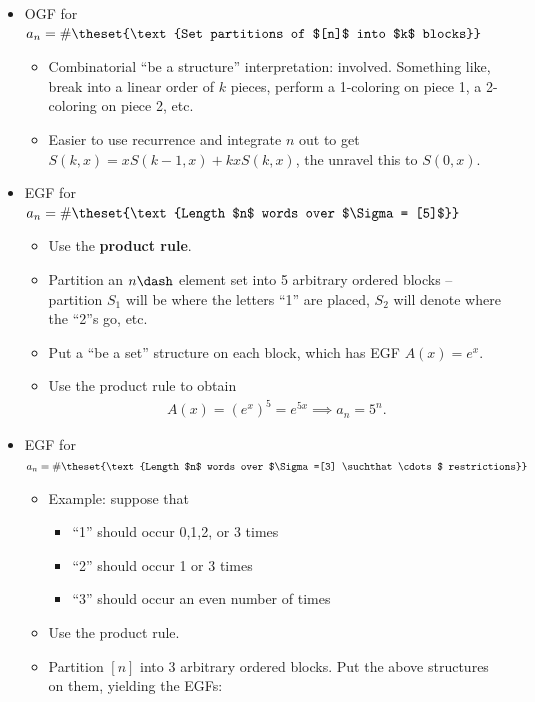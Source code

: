 \begin{itemize}
\tightlist
\item
  OGF for
  \(a_n = \#\theset{\text{Set partitions of $[n]$ into $k$ blocks}}\)

  \begin{itemize}
  \tightlist
  \item
    Combinatorial ``be a structure'' interpretation: involved. Something
    like, break into a linear order of \(k\) pieces, perform a
    1-coloring on piece 1, a 2-coloring on piece 2, etc.
  \item
    Easier to use recurrence and integrate \(n\) out to get
    \(S(k, x) = xS(k-1, x) + kxS(k, x)\), the unravel this to
    \(S(0, x)\).
  \end{itemize}
\item
  EGF for
  \(a_n = \#\theset{\text{Length $n$ words over $\Sigma = [5]$}}\)

  \begin{itemize}
  \tightlist
  \item
    Use the \textbf{product rule}.
  \item
    Partition an \(n\dash\) element set into 5 arbitrary ordered blocks
    -- partition \(S_1\) will be where the letters ``1'' are placed,
    \(S_2\) will denote where the ``2''s go, etc.
  \item
    Put a ``be a set'' structure on each block, which has EGF
    \(A(x) = e^x\).
  \item
    Use the product rule to obtain
    \begin{align*}
    A(x) = (e^x)^5 = e^{5x} \implies a_n = 5^n.
    \end{align*}
  \end{itemize}
\item
  EGF for
  \(a_n = \#\theset{\text{Length $n$ words over $\Sigma =[3] \suchthat \cdots$ restrictions}}\)

  \begin{itemize}
  \tightlist
  \item
    Example: suppose that

    \begin{itemize}
    \tightlist
    \item
      ``1'' should occur 0,1,2, or 3 times
    \item
      ``2'' should occur 1 or 3 times
    \item
      ``3'' should occur an even number of times
    \end{itemize}
  \item
    Use the product rule.
  \item
    Partition \([n]\) into 3 arbitrary ordered blocks. Put the above
    structures on them, yielding the EGFs:


\end{itemize}
\end{itemize}
